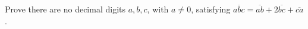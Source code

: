 Prove there are no decimal digits $a,b,c$, with $a\ne0$, satisfying $\overline{abc}=\overline{ab}+2\overline{bc}+\overline{ca}$.
